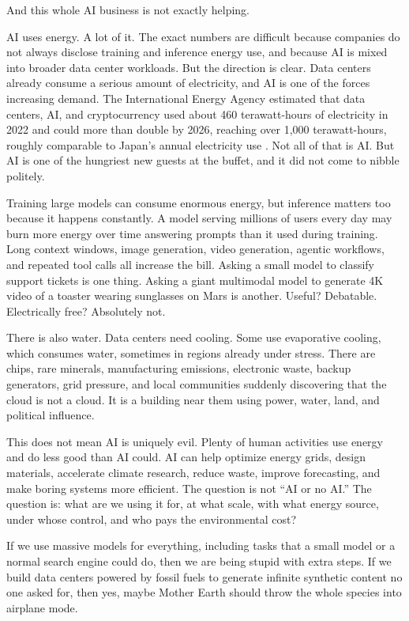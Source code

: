 \documentclass[12pt,oneside]{book}
\begin{document}
And this whole AI business is not exactly helping.

AI uses energy. A lot of it. The exact numbers are difficult because companies do not always disclose training and inference energy use, and because AI is mixed into broader data center workloads. But the direction is clear. Data centers already consume a serious amount of electricity, and AI is one of the forces increasing demand. The International Energy Agency estimated that data centers, AI, and cryptocurrency used about 460 terawatt-hours of electricity in 2022 and could more than double by 2026, reaching over 1,000 terawatt-hours, roughly comparable to Japan's annual electricity use \parencite{iea2024}. Not all of that is AI. But AI is one of the hungriest new guests at the buffet, and it did not come to nibble politely.

Training large models can consume enormous energy, but inference matters too because it happens constantly. A model serving millions of users every day may burn more energy over time answering prompts than it used during training. Long context windows, image generation, video generation, agentic workflows, and repeated tool calls all increase the bill. Asking a small model to classify support tickets is one thing. Asking a giant multimodal model to generate 4K video of a toaster wearing sunglasses on Mars is another. Useful? Debatable. Electrically free? Absolutely not.

There is also water. Data centers need cooling. Some use evaporative cooling, which consumes water, sometimes in regions already under stress. There are chips, rare minerals, manufacturing emissions, electronic waste, backup generators, grid pressure, and local communities suddenly discovering that the cloud is not a cloud. It is a building near them using power, water, land, and political influence.

This does not mean AI is uniquely evil. Plenty of human activities use energy and do less good than AI could. AI can help optimize energy grids, design materials, accelerate climate research, reduce waste, improve forecasting, and make boring systems more efficient. The question is not ``AI or no AI.'' The question is: what are we using it for, at what scale, with what energy source, under whose control, and who pays the environmental cost?

If we use massive models for everything, including tasks that a small model or a normal search engine could do, then we are being stupid with extra steps. If we build data centers powered by fossil fuels to generate infinite synthetic content no one asked for, then yes, maybe Mother Earth should throw the whole species into airplane mode.
\end{document}
